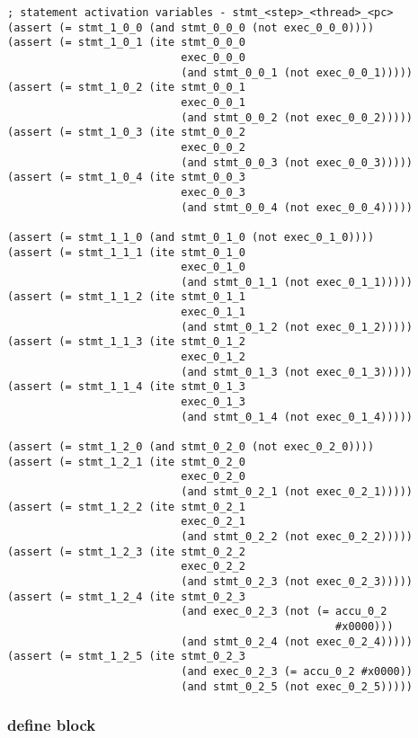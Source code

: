 \begin{lstlisting}[language=SMTLib]
; statement activation variables - stmt_<step>_<thread>_<pc>
(assert (= stmt_1_0_0 (and stmt_0_0_0 (not exec_0_0_0))))
(assert (= stmt_1_0_1 (ite stmt_0_0_0
                           exec_0_0_0
                           (and stmt_0_0_1 (not exec_0_0_1)))))
(assert (= stmt_1_0_2 (ite stmt_0_0_1
                           exec_0_0_1
                           (and stmt_0_0_2 (not exec_0_0_2)))))
(assert (= stmt_1_0_3 (ite stmt_0_0_2
                           exec_0_0_2
                           (and stmt_0_0_3 (not exec_0_0_3)))))
(assert (= stmt_1_0_4 (ite stmt_0_0_3
                           exec_0_0_3
                           (and stmt_0_0_4 (not exec_0_0_4)))))

(assert (= stmt_1_1_0 (and stmt_0_1_0 (not exec_0_1_0))))
(assert (= stmt_1_1_1 (ite stmt_0_1_0
                           exec_0_1_0
                           (and stmt_0_1_1 (not exec_0_1_1)))))
(assert (= stmt_1_1_2 (ite stmt_0_1_1
                           exec_0_1_1
                           (and stmt_0_1_2 (not exec_0_1_2)))))
(assert (= stmt_1_1_3 (ite stmt_0_1_2
                           exec_0_1_2
                           (and stmt_0_1_3 (not exec_0_1_3)))))
(assert (= stmt_1_1_4 (ite stmt_0_1_3
                           exec_0_1_3
                           (and stmt_0_1_4 (not exec_0_1_4)))))

(assert (= stmt_1_2_0 (and stmt_0_2_0 (not exec_0_2_0))))
(assert (= stmt_1_2_1 (ite stmt_0_2_0
                           exec_0_2_0
                           (and stmt_0_2_1 (not exec_0_2_1)))))
(assert (= stmt_1_2_2 (ite stmt_0_2_1
                           exec_0_2_1
                           (and stmt_0_2_2 (not exec_0_2_2)))))
(assert (= stmt_1_2_3 (ite stmt_0_2_2
                           exec_0_2_2
                           (and stmt_0_2_3 (not exec_0_2_3)))))
(assert (= stmt_1_2_4 (ite stmt_0_2_3
                           (and exec_0_2_3 (not (= accu_0_2
                                                   #x0000)))
                           (and stmt_0_2_4 (not exec_0_2_4)))))
(assert (= stmt_1_2_5 (ite stmt_0_2_3
                           (and exec_0_2_3 (= accu_0_2 #x0000))
                           (and stmt_0_2_5 (not exec_0_2_5)))))
\end{lstlisting}

\subsubsection{define block}

